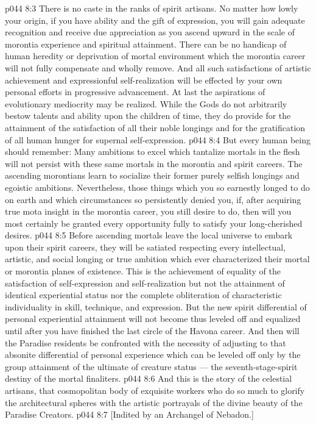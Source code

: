 \vs p044 8:3 \pc There is no caste in the ranks of spirit artisans. No matter how lowly your origin, if you have ability and the gift of expression, you will gain adequate recognition and receive due appreciation as you ascend upward in the scale of morontia experience and spiritual attainment. There can be no handicap of human heredity or deprivation of mortal environment which the morontia career will not fully compensate and wholly remove. And all such satisfactions of artistic achievement and expressionful self\hyp{}realization will be effected by your own personal efforts in progressive advancement. At last the aspirations of evolutionary mediocrity may be realized. While the Gods do not arbitrarily bestow talents and ability upon the children of time, they do provide for the attainment of the satisfaction of all their noble longings and for the gratification of all human hunger for supernal self\hyp{}expression.
\vs p044 8:4 But every human being should remember: Many ambitions to excel which tantalize mortals in the flesh will not persist with these same mortals in the morontia and spirit careers. The ascending morontians learn to socialize their former purely selfish longings and egoistic ambitions. Nevertheless, those things which you so earnestly longed to do on earth and which circumstances so persistently denied you, if, after acquiring true mota insight in the morontia career, you still desire to do, then will you most certainly be granted every opportunity fully to satisfy your long\hyp{}cherished desires.
\vs p044 8:5 Before ascending mortals leave the local universe to embark upon their spirit careers, they will be satiated respecting every intellectual, artistic, and social longing or true ambition which ever characterized their mortal or morontia planes of existence. This is the achievement of equality of the satisfaction of self\hyp{}expression and self\hyp{}realization but not the attainment of identical experiential status nor the complete obliteration of characteristic individuality in skill, technique, and expression. But the new spirit differential of personal experiential attainment will not become thus leveled off and equalized until after you have finished the last circle of the Havona career. And then will the Paradise residents be confronted with the necessity of adjusting to that absonite differential of personal experience which can be leveled off only by the group attainment of the ultimate of creature status --- the seventh\hyp{}stage\hyp{}spirit destiny of the mortal finaliters.
\vs p044 8:6 \pc And this is the story of the celestial artisans, that cosmopolitan body of exquisite workers who do so much to glorify the architectural spheres with the artistic portrayals of the divine beauty of the Paradise Creators.
\vsetoff
\vs p044 8:7 [Indited by an Archangel of Nebadon.]
\quizlink

